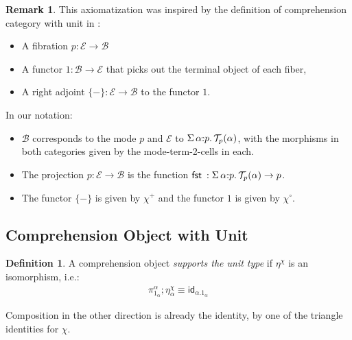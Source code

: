 \documentclass[10pt]{article}
\theoremstyle{definition}
\newtheorem{definition}{Definition}
\newtheorem{remark}{Remark}
\newcommand\dsd[1]{\ensuremath{\mathsf{#1}}}
\newcommand{\app}[2]{\ensuremath{#1 \: #2}}
\newcommand{\sigmacl}[3]{\ensuremath{\textnormal{$\Sigma$}\,#1{:}#2.\,#3}}
\newcommand{\fst}[1]{\app{\dsd{fst}}{#1}}
\newcommand{\id}{\mathsf{id}}
\newcommand\El[2]{\mathcal{T}_{#1}(#2)}
\begin{document}
\begin{remark}
This axiomatization was inspired by the definition of comprehension
category with unit in \cite{ahman+16fibered}:
\begin{itemize}
\item A fibration $p : \mathcal{E} \to \mathcal{B}$
\item A functor $1 : \mathcal{B} \to \mathcal{E}$ that picks out the terminal object of each fiber,
\item A right adjoint $\{-\} : \mathcal{E} \to \mathcal{B}$ to the functor $1$.
\end{itemize}
In our notation:
\begin{itemize}
\item $\mathcal{B}$ corresponds to the mode $p$ and $\mathcal{E}$ to $\sigmacl{\alpha}{p}{\El{p}{\alpha}}$, with the morphisms in both categories given by the mode-term-2-cells in each.

\item The projection $p : \mathcal{E} \to \mathcal{B}$ is the function $\fst : \sigmacl{\alpha}{p}{\El{p}{\alpha}} \to p$. 

\item The functor $\{-\}$ is given by $\chi^+$ and the functor $1$ is given by $\chi^\circ$.
\end{itemize}
\end{remark}

\subsection{Comprehension Object with Unit}
\begin{definition}
A comprehension object \emph{supports the unit type} if $\eta^\chi$ is an isomorphism, i.e.:
\begin{align}
\pi^\alpha_{1_\alpha} ; \eta^\chi_\alpha \equiv \id_{\alpha.1_\alpha}
\end{align}
\end{definition}
Composition in the other direction is already the identity, by one of the triangle identities for $\chi$.
\end{document}
